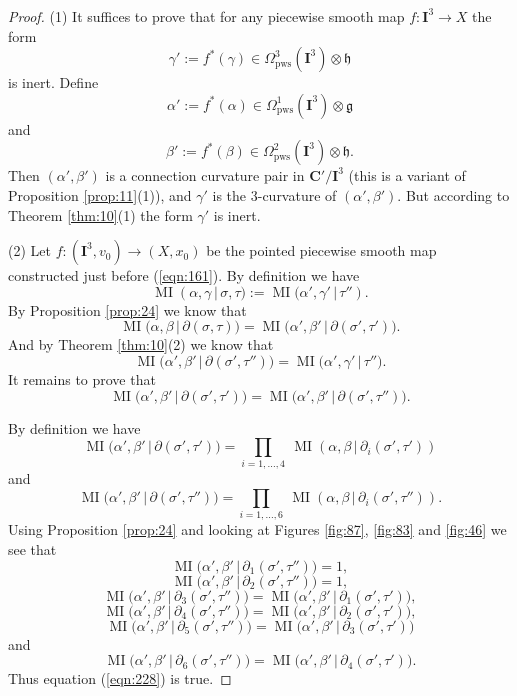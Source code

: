 \documentclass[10pt, a4paper]{amsart}
\theoremstyle{definition}
\numberwithin{equation}{section}
\newcommand{\opn}{\operatorname}
\newcommand{\mfrak}[1]{\mathfrak{#1}}
\newcommand{\mbf}[1]{\mathbf{#1}}
\newcommand{\mrm}[1]{\mathrm{#1}}
\renewcommand{\vert}{\, | \,}
\newcommand{\g}{\mfrak{g}}
\newcommand{\h}{\mfrak{h}}
\begin{document}
\begin{proof}
(1) It suffices to prove that for any piecewise smooth map 
$f : \mbf{I}^3 \to X$ the form
\[ \gamma' := f^*(\gamma) \in \Omega^3_{\mrm{pws}}(\mbf{I}^3) \otimes \h \]
is inert. Define
\[ \alpha' := f^*(\alpha) \in \Omega^1_{\mrm{pws}}(\mbf{I}^3) \otimes \g \]
and
\[ \beta' := f^*(\beta) \in \Omega^2_{\mrm{pws}}(\mbf{I}^3) \otimes \h . \]
Then $(\alpha', \beta')$ is a connection curvature pair in 
$\mbf{C}' / \mbf{I}^3$ (this is a variant of Proposition \ref{prop:11}(1)), and
$\gamma'$ is the $3$-curvature of $(\alpha', \beta')$.
But according to Theorem \ref{thm:10}(1) the form $\gamma'$ is inert.

\medskip \noindent
(2) Let $f : (\mbf{I}^3, v_0) \to (X, x_0)$ be the pointed piecewise smooth map
constructed just before (\ref{eqn:161}). 
By definition we have
\[ \opn{MI}(\alpha, \gamma \vert \sigma, \tau) :=
\opn{MI} \bigl( \alpha', \gamma' \vert \tau'') . \]
By Proposition \ref{prop:24} we know that
\[ \opn{MI} \bigl( \alpha, \beta \vert \partial (\sigma, \tau) \bigr) = 
\opn{MI} \bigl( \alpha', \beta' \vert \partial (\sigma', \tau') \bigr) . \]
And by Theorem \ref{thm:10}(2) we know that
\[ \opn{MI} \bigl( \alpha', \beta' \vert \partial (\sigma', \tau'') \bigr) =
\opn{MI} \bigl( \alpha', \gamma' \vert \tau'') . \]
It remains to prove that
\begin{equation} \label{eqn:228}
\opn{MI} \bigl( \alpha', \beta' \vert \partial (\sigma', \tau') \bigr) = 
\opn{MI} \bigl( \alpha', \beta' \vert \partial (\sigma', \tau'') \bigr) .
\end{equation}

By definition we have
\[ \opn{MI} \bigl( \alpha', \beta' \vert \partial (\sigma', \tau') \bigr) = 
\prod_{i = 1, \ldots, 4} \ 
\opn{MI}(\alpha, \beta \vert \partial_i(\sigma', \tau') )  \]
and
\[ \opn{MI} \bigl( \alpha', \beta' \vert \partial (\sigma', \tau'') \bigr) = 
\prod_{i = 1, \ldots, 6} \ 
\opn{MI}(\alpha, \beta \vert \partial_i(\sigma', \tau'') ) . \]
Using Proposition \ref{prop:24} and looking at Figures
\ref{fig:87}, \ref{fig:83} and \ref{fig:46} we see that
\[ \opn{MI} \bigl( \alpha', \beta' \vert \partial_1(\sigma', \tau'') \bigr) = 1 
, \]
\[ \opn{MI} \bigl( \alpha', \beta' \vert \partial_2(\sigma', \tau'') \bigr) = 1
, \]
\[ \opn{MI} \bigl( \alpha', \beta' \vert \partial_3(\sigma', \tau'')  \bigr) = 
\opn{MI} \bigl( \alpha', \beta' \vert \partial_1(\sigma', \tau')  \bigr)  , \]
\[ \opn{MI} \bigl( \alpha', \beta' \vert \partial_4(\sigma', \tau'')  \bigr) = 
\opn{MI} \bigl( \alpha', \beta' \vert \partial_2(\sigma', \tau')  \bigr)  , \]
\[ \opn{MI} \bigl( \alpha', \beta' \vert \partial_5(\sigma', \tau'')  \bigr) = 
\opn{MI} \bigl( \alpha', \beta' \vert \partial_3(\sigma', \tau')  \bigr)   \]
and
\[ \opn{MI} \bigl( \alpha', \beta' \vert \partial_6(\sigma', \tau'')  \bigr) = 
\opn{MI} \bigl( \alpha', \beta' \vert \partial_4(\sigma', \tau')  \bigr) .  \]
Thus equation (\ref{eqn:228}) is true. 
\end{proof}
\end{document}
